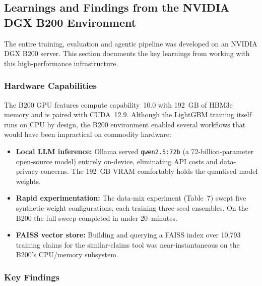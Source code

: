 \documentclass[12pt,a4paper]{article}
\begin{document}
\subsection{Learnings and Findings from the NVIDIA DGX B200 Environment}

The entire training, evaluation and agentic pipeline was developed on an NVIDIA DGX B200 server. This section documents the key learnings from working with this high-performance infrastructure.

\subsubsection{Hardware Capabilities}

The B200 GPU features compute capability~10.0 with 192~GB of HBM3e memory and is paired with CUDA~12.9. Although the LightGBM training itself runs on CPU by design, the B200 environment enabled several workflows that would have been impractical on commodity hardware:

\begin{itemize}
    \item \textbf{Local LLM inference:} Ollama served \texttt{qwen2.5:72b} (a 72-billion-parameter open-source model) entirely on-device, eliminating API costs and data-privacy concerns. The 192~GB VRAM comfortably holds the quantised model weights.
    \item \textbf{Rapid experimentation:} The data-mix experiment (Table~7) swept five synthetic-weight configurations, each training three-seed ensembles. On the B200 the full sweep completed in under 20~minutes.
    \item \textbf{FAISS vector store:} Building and querying a FAISS index over 10,793 training claims for the similar-claims tool was near-instantaneous on the B200's CPU/memory subsystem.
\end{itemize}

\subsubsection{Key Findings}
\end{document}
